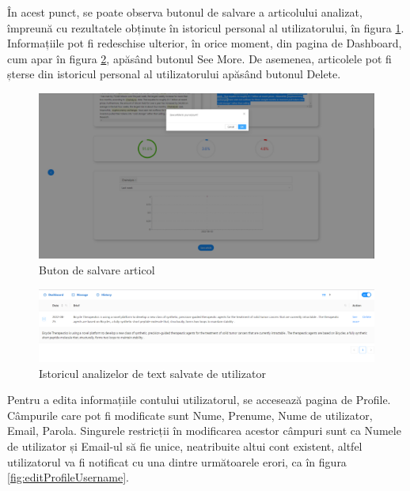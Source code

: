 În acest punct, se poate observa butonul de salvare a articolului analizat, împreună cu rezultatele obținute în istoricul personal al utilizatorului, în figura \ref{fig:saveArticle}.  \\
Informațiile pot fi redeschise ulterior, în orice moment, din pagina de Dashboard, cum apar în figura \ref{fig:personalHistory}, apăsând butonul See More. De asemenea, articolele pot fi șterse din istoricul personal
al utilizatorului apăsând butonul Delete.
\begin{figure}[H]
	\centering
	\includegraphics[width=150mm]{figs/saveArticle.png}
    \caption{Buton de salvare articol}
	\label{fig:saveArticle}
\end{figure}
\begin{figure}[H]
	\centering
	\includegraphics[width=150mm]{figs/personalHistory.png}
    \caption{Istoricul analizelor de text salvate de utilizator}
	\label{fig:personalHistory}
\end{figure}

Pentru a edita informațiile contului utilizatorul, se accesează pagina de Profile. Câmpurile care pot fi modificate sunt Nume, Prenume, Nume de utilizator, Email, Parola. 
Singurele restricții în modificarea acestor câmpuri sunt ca Numele de utilizator și Email-ul să fie unice, neatribuite altui cont existent, altfel utilizatorul va fi notificat cu una dintre următoarele erori, ca în figura \ref{fig:editProfileUsername}.

